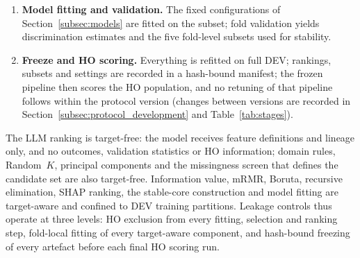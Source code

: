 \documentclass[final,5p,twocolumn]{elsarticle}
\newcommand{\Kfeat}{K}
\begin{document}
\begin{enumerate}
    \item \textbf{Model fitting and validation.} The fixed configurations of Section~\ref{subsec:models} are fitted on the subset; fold validation yields discrimination estimates and the five fold-level subsets used for stability.
    \item \textbf{Freeze and HO scoring.} Everything is refitted on full DEV; rankings, subsets and settings are recorded in a hash-bound manifest; the frozen pipeline then scores the HO population, and no retuning of that pipeline follows within the protocol version (changes between versions are recorded in Section~\ref{subsec:protocol_development} and Table~\ref{tab:stages}).
\end{enumerate}
The LLM ranking is target-free: the model receives feature definitions and lineage only, and no outcomes, validation statistics or HO information; domain rules, Random~$\Kfeat$, principal components and the missingness screen that defines the candidate set are also target-free. Information value, mRMR, Boruta, recursive elimination, SHAP ranking, the stable-core construction and model fitting are target-aware and confined to DEV training partitions. Leakage controls thus operate at three levels: HO exclusion from every fitting, selection and ranking step, fold-local fitting of every target-aware component, and hash-bound freezing of every artefact before each final HO scoring run.
\end{document}
